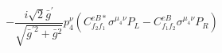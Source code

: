 %
\begin{dmath*}
%
  -  \frac{i \sqrt{2} {\bar g}^\prime}{\sqrt{{\bar g}^{\prime 2} + {\bar g}{}^2}}p_4^{\nu} \left(C^{eB*}_{f_2 f_1} \sigma^{\mu_4 \nu } P_L  - C^{eB}_{f_1 f_2} \sigma^{\mu_4 \nu } P_R \right)
%
\end{dmath*}
%
